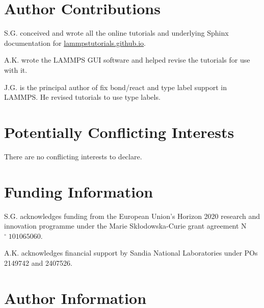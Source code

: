 \documentclass[9pt,tutorial]{livecoms}
\begin{document}
\section*{Author Contributions}
S.G. conceived and wrote all the online tutorials and underlying Sphinx documentation
for \href{https://lammpstutorials.github.io}{lammpstutorials.github.io}.

\noindent A.K. wrote the LAMMPS GUI software and helped revise the
tutorials for use with it.

\noindent J.G. is the principal author of fix bond/react and type label
support in LAMMPS.  He revised tutorials to use type labels.

\section*{Potentially Conflicting Interests}

There are no conflicting interests to declare.

\section*{Funding Information}

S.G. acknowledges funding from the European Union's Horizon 2020 research and
innovation programme under the Marie Skłodowska-Curie grant agreement N$^\circ\;101065060$.

\noindent A.K. acknowledges financial support by Sandia National Laboratories under
POs 2149742 and 2407526.

\section*{Author Information}
\makeorcid



\end{document}

